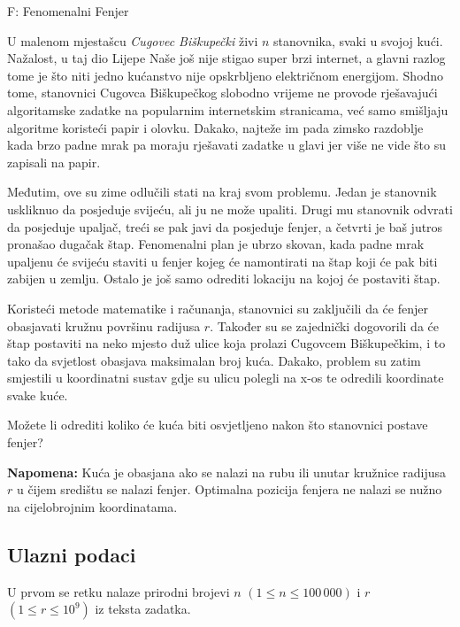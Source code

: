\begin{statement}[
  timelimit=1 s,
  memorylimit=512 MiB,
]{F: Fenomenalni Fenjer}

U malenom mjestašcu \textit{Cugovec Biškupečki} živi $n$ stanovnika, svaki u
svojoj kući. Nažalost, u taj dio Lijepe Naše još nije stigao super brzi
internet, a glavni razlog tome je što niti jedno kućanstvo nije opskrbljeno
električnom energijom. Shodno tome, stanovnici Cugovca Biškupečkog slobodno
vrijeme ne provode rješavajući algoritamske zadatke na popularnim
internetskim stranicama, već samo smišljaju algoritme koristeći papir i
olovku. Dakako, najteže im pada zimsko razdoblje kada brzo padne mrak pa
moraju rješavati zadatke u glavi jer više ne vide što su zapisali na papir.

Međutim, ove su zime odlučili stati na kraj svom problemu. Jedan je stanovnik
uskliknuo da posjeduje svijeću, ali ju ne može upaliti. Drugi mu stanovnik
odvrati da posjeduje upaljač, treći se pak javi da posjeduje fenjer, a
četvrti je baš jutros pronašao dugačak štap. Fenomenalni plan je ubrzo
skovan, kada padne mrak upaljenu će svijeću staviti u fenjer kojeg će
namontirati na štap koji će pak biti zabijen u zemlju. Ostalo je još samo
odrediti lokaciju na kojoj će postaviti štap.

Koristeći metode matematike i računanja, stanovnici su zaključili da će fenjer
obasjavati kružnu površinu radijusa $r$. Također su se zajednički dogovorili
da će štap postaviti na neko mjesto duž ulice koja prolazi Cugovcem
Biškupečkim, i to tako da svjetlost obasjava maksimalan broj kuća. Dakako,
problem su zatim smjestili u koordinatni sustav gdje su ulicu polegli na x-os
te odredili koordinate svake kuće.

Možete li odrediti koliko će kuća biti osvjetljeno nakon što stanovnici postave
fenjer?

\textbf{Napomena:} Kuća je obasjana ako se nalazi na rubu ili unutar kružnice
radijusa $r$ u čijem središtu se nalazi fenjer. Optimalna pozicija fenjera ne
nalazi se nužno na cijelobrojnim koordinatama.

\subsection*{Ulazni podaci}
U prvom se retku nalaze prirodni brojevi $n$ $(1 \le n \le 100\,000)$ i $r$
$(1 \le r \le 10^9)$ iz teksta zadatka.


\end{statement}
